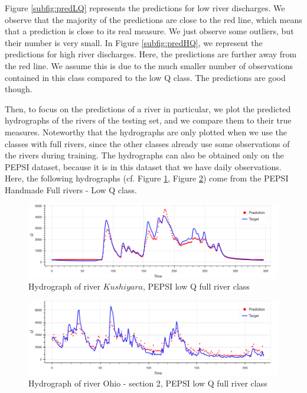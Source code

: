 Figure \ref{subfig:predLQ} represents the predictions for low river discharges. We observe that the majority of the predictions are close to the red line, which means that a prediction is close to its real measure. We just observe some outliers, but their number is very small. In Figure \ref{subfig:predHQ}, we represent the predictions for high river discharges. Here, the predictions are further away from the red line. We assume this is due to the much smaller number of observations contained in this class compared to the low Q class. The predictions are good though.

Then, to focus on the predictions of a river in particular, we plot the predicted hydrographs of the rivers of the testing set, and we compare them to their true measures. Noteworthy that the hydrographs are only plotted when we use the classes with full rivers, since the other classes already use some observations of the rivers during training. The hydrographs can also be obtained only on the PEPSI dataset, because it is in this dataset that we have daily observations. Here, the following hydrographs (cf. Figure \ref{fig:hydrographKushiyara}, Figure \ref{fig:hydrographOhio}) come from the PEPSI Handmade Full rivers - Low Q class. 

\begin{figure}[H]
    \centering
    \includegraphics[scale = 0.4]{Graph/Hydrogramme_Kushiyara.png}
    \caption{Hydrograph of river $Kushiyara$, PEPSI low Q full river class}
    \label{fig:hydrographKushiyara}
\end{figure}
\begin{figure}[H]
    \centering
    \includegraphics[scale = 0.4]{Graph/Hydrogramme_OhioSection2.png}
    \caption{Hydrograph of river Ohio - section 2, PEPSI low Q full river class}
    \label{fig:hydrographOhio}
\end{figure}

